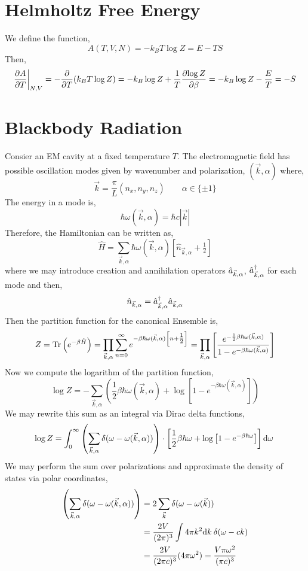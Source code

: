 \documentclass[12pt]{article}
\begin{document}
\section{Helmholtz Free Energy}

We define the function,
\[ A(T, V, N) = - k_B T \log{Z} = E - TS \]
Then,
\[ \frac{\partial{A}}{\partial{T}} \bigg|_{N,V} = - \frac{\partial{}}{\partial{T}} (k_B T \log{Z}) = - k_B \log{Z} + \frac{1}{T} \frac{\partial{\log{Z}}}{\partial{\beta}} = - k_B \log{Z} - \frac{E}{T} = - S \]


\section{Blackbody Radiation}

Consier an EM cavity at a fixed temperature $T$. The electromagnetic field has possible oscillation modes given by wavenumber and polarization, $(\vec{k}, \alpha)$ where,
\[ \vec{k} = \frac{\pi}{L} (n_x, n_y, n_z) \quad \quad \alpha \in \{ \pm 1 \} \]
The energy in a mode is,
\[ \hbar \omega(\vec{k}, \alpha) = \hbar c |\vec{k} | \]
Therefore, the Hamiltonian can be written as,
\[ \hat{H} = \sum_{\vec{k}, \alpha} \hbar \omega(\vec{k}, \alpha) \left[ \hat{n}_{\vec{k},\alpha} + \tfrac{1}{2} \right] \]
where we may introduce creation and annihilation operators $\hat{a}_{\vec{k}, \alpha}$, $\hat{a}^\dagger_{\vec{k}, \alpha}$ for each mode and then,
\[ \hat{n}_{\vec{k}, \alpha} = \hat{a}^\dagger_{\vec{k}, \alpha} \hat{a}_{\vec{k}, \alpha} \]
Then the partition function for the canonical Ensemble is,
\[ Z = \mathrm{Tr} \left( e^{-\beta \hat{H}} \right) = \prod_{\vec{k}, \alpha} \sum_{n = 0}^\infty e^{- \beta  \hbar \omega(\vec{k}, \alpha) \left[ n + \tfrac{1}{2} \right]} = \prod_{\vec{k}, \alpha} \left[ \frac{e^{-\frac{1}{2} \beta \hbar \omega(\vec{k}, \alpha)}}{1 - e^{-\beta \hbar \omega(\vec{k}, \alpha)}} \right] \]
Now we compute the logarithm of the partition function,
\[ \log{Z} = - \sum_{\vec{k}, \alpha} \left( \frac{1}{2} \beta \hbar \omega(\vec{k}, \alpha) + \log{\left[1 - e^{-\beta \hbar \omega(\vec{k}, \alpha)} \right]}  \right) \]
We may rewrite this sum as an integral via Dirac delta functions,
\begin{align*}
\log{Z} = \int_0^\infty \left( \sum_{\vec{k}, \alpha} \delta(\omega - \omega(\vec{k}, \alpha)) \right) \cdot \left[ \frac{1}{2} \beta \hbar \omega + \log{\left[1 - e^{-\beta \hbar \omega} \right]}  \right] \mathrm{d}\omega \:
\end{align*}
We may perform the sum over polarizations and approximate the density of states via polar coordinates,
\begin{align*}
\left( \sum_{\vec{k}, \alpha} \delta(\omega - \omega(\vec{k}, \alpha)) \right) & = 2 \sum_{\vec{k}} \delta(\omega - \omega(\vec{k}))
\\
& = \frac{2 V}{(2 \pi)^3} \int 4 \pi k^2 \mathrm{d}k \: \delta(\omega - c k)  
\\
& = \frac{2 V}{(2 \pi c)^3} (4 \pi \omega^2) = \frac{V \pi \omega^2}{(\pi c)^3}
\end{align*}
\end{document}
